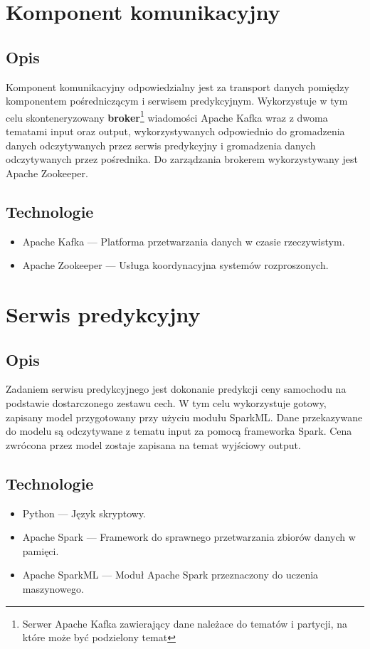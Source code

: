 \documentclass[12pt, a4paper]{report}
\begin{document}
\chapter{Komponent komunikacyjny}
\section{Opis}
Komponent komunikacyjny odpowiedzialny jest za transport danych pomiędzy komponentem pośredniczącym i serwisem predykcyjnym.
Wykorzystuje w tym celu skonteneryzowany \textbf{broker}\footnote{Serwer Apache Kafka zawierający dane należace do tematów i partycji, na które może być podzielony temat}
wiadomości Apache Kafka wraz z dwoma tematami input oraz output, wykorzystywanych
odpowiednio do gromadzenia danych odczytywanych przez serwis predykcyjny i gromadzenia danych odczytywanych przez pośrednika.
Do zarządzania brokerem wykorzystywany jest Apache Zookeeper.
\section{Technologie}
\begin{itemize}
    \item Apache Kafka --- Platforma przetwarzania danych w czasie rzeczywistym.
    \item Apache Zookeeper --- Usługa koordynacyjna systemów rozproszonych.
\end{itemize}


\chapter{Serwis predykcyjny}
\section{Opis}
    Zadaniem serwisu predykcyjnego jest dokonanie predykcji ceny samochodu na podstawie dostarczonego zestawu cech.
    W tym celu wykorzystuje gotowy, zapisany model przygotowany przy użyciu modułu SparkML.\@
    Dane przekazywane do modelu są odczytywane z tematu input za pomocą frameworka Spark. Cena zwrócona przez
    model zostaje zapisana na temat wyjściowy output.
\section{Technologie}
\begin{itemize}
    \item Python --- Język skryptowy. 
    \item Apache Spark --- Framework do sprawnego przetwarzania zbiorów danych w pamięci.
    \item Apache SparkML --- Moduł Apache Spark przeznaczony do uczenia maszynowego.
\end{itemize}
\end{document}
